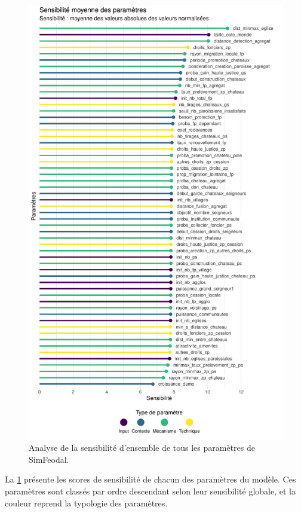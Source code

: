 \begin{figure}[H]
	\centering
	\includegraphics[width=\linewidth]{img/sensibilite_globale.pdf}
	\caption{Analyse de la sensibilité d'ensemble de tous les paramètres de SimFeodal.}
	\label{fig:sensibilite-globale}
\end{figure}

La \cref{fig:sensibilite-globale} présente les \og scores de sensibilité\fg{} de chacun des paramètres du modèle.
Ces paramètres sont classés par ordre descendant selon leur sensibilité globale, et la couleur reprend la typologie des paramètres.

